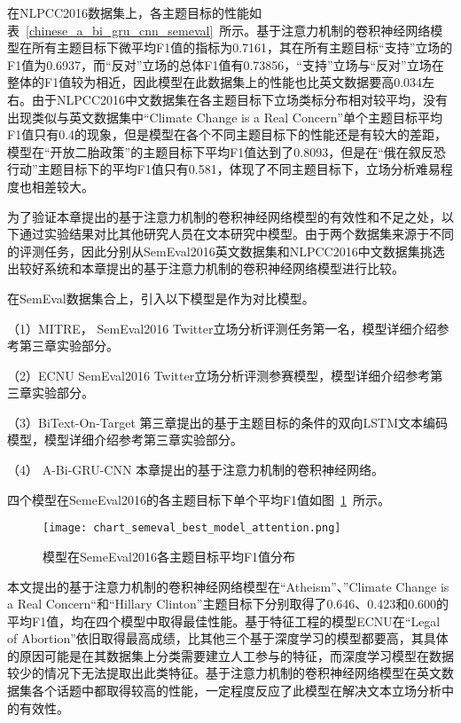 在NLPCC2016数据集上，各主题目标的性能如表~\ref{chinese_a_bi_gru_cnn_semeval}~所示。基于注意力机制的卷积神经网络模型在所有主题目标下微平均F1值的指标为0.7161，其在所有主题目标“支持”立场的F1值为0.6937，而“反对”立场的总体F1值有0.73856，“支持”立场与“反对”立场在整体的F1值较为相近，因此模型在此数据集上的性能也比英文数据要高0.034左右。由于NLPCC2016中文数据集在各主题目标下立场类标分布相对较平均，没有出现类似与英文数据集中“Climate Change is a Real Concern”单个主题目标平均F1值只有0.4的现象，但是模型在各个不同主题目标下的性能还是有较大的差距，模型在“开放二胎政策”的主题目标下平均F1值达到了0.8093，但是在“俄在叙反恐行动”主题目标下的平均F1值只有0.581，体现了不同主题目标下，立场分析难易程度也相差较大。


为了验证本章提出的基于注意力机制的卷积神经网络模型的有效性和不足之处，以下通过实验结果对比其他研究人员在文本研究中模型。由于两个数据集来源于不同的评测任务，因此分别从SemEval2016英文数据集和NLPCC2016中文数据集挑选出较好系统和本章提出的基于注意力机制的卷积神经网络模型进行比较。

在SemEval数据集合上，引入以下模型是作为对比模型。

（1）MITRE， SemEval2016 Twitter立场分析评测任务第一名，模型详细介绍参考第三章实验部分。

（2）ECNU   SemEval2016 Twitter立场分析评测参赛模型，模型详细介绍参考第三章实验部分。

（3）BiText-On-Target 第三章提出的基于主题目标的条件的双向LSTM文本编码模型，模型详细介绍参考第三章实验部分。

（4） A-Bi-GRU-CNN 本章提出的基于注意力机制的卷积神经网络。

四个模型在SemeEval2016的各主题目标下单个平均F1值如图~\ref{chart_semeval_best_model_attention}~所示。
\begin{figure}[htbp]
	\centering
	\texttt{[image: chart\_semeval\_best\_model\_attention.png]}
	\caption[rnn_vanish]{模型在SemeEval2016各主题目标平均F1值分布}
	\label{chart_semeval_best_model_attention}
\end{figure}

本文提出的基于注意力机制的卷积神经网络模型在“Atheism”、”Climate Change is a Real Concern“和“Hillary Clinton”主题目标下分别取得了0.646、0.423和0.600的平均F1值，均在四个模型中取得最佳性能。基于特征工程的模型ECNU在“Legal of Abortion”依旧取得最高成绩，比其他三个基于深度学习的模型都要高，其具体的原因可能是在其数据集上分类需要建立人工参与的特征，而深度学习模型在数据较少的情况下无法提取出此类特征。基于注意力机制的卷积神经网络模型在英文数据集各个话题中都取得较高的性能，一定程度反应了此模型在解决文本立场分析中的有效性。

